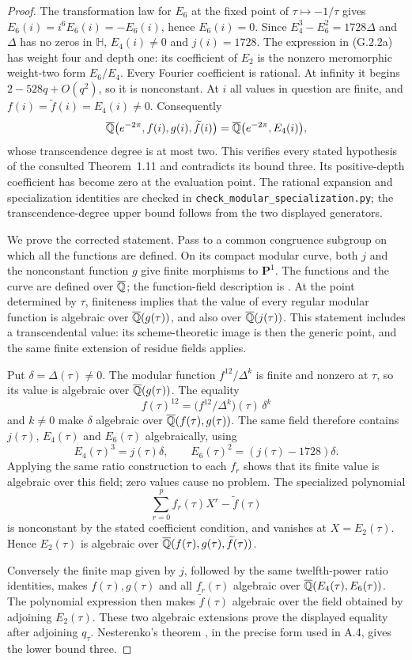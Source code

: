 \begin{proof}
The transformation law for $E_6$ at the fixed point of
$\tau\mapsto-1/\tau$ gives
$E_6(i)=i^6E_6(i)=-E_6(i)$, hence $E_6(i)=0$.
Since $E_4^3-E_6^2=1728\Delta$ and $\Delta$ has no zeros
in $\mathbb H$, $E_4(i)\ne0$ and $j(i)=1728$.
The expression in (G.2.2a) has weight four and depth one:
its coefficient of $E_2$ is the nonzero meromorphic
weight-two form $E_6/E_4$. Every Fourier coefficient is
rational. At infinity it begins $2-528q+O(q^2)$, so it
is nonconstant. At $i$ all values in question are finite,
and $f(i)=\widetilde f(i)=E_4(i)\ne0$. Consequently
\[
 \overline{\mathbb Q}\bigl(e^{-2\pi},f(i),g(i),\widetilde f(i)\bigr)
       =\overline{\mathbb Q}\bigl(e^{-2\pi},E_4(i)\bigr),
\]
whose transcendence degree is at most two. This verifies
every stated hypothesis of the consulted Theorem~1.11 and
contradicts its bound three. Its positive-depth coefficient
has become zero at the evaluation point. The rational
expansion and specialization identities are checked in
\texttt{check\_modular\_specialization.py}; the transcendence-degree
upper bound follows from the two displayed generators.

We prove the corrected statement. Pass to a common congruence
subgroup on which all the functions are defined. On its
compact modular curve, both $j$ and the nonconstant function
$g$ give finite morphisms to $\mathbf P^1$. The functions
and the curve are defined over $\overline{\mathbb Q}$; the function-field
description is \cite[Theorem 2.11, pp.10--11]{BhowmikPathak2024}.
At the point determined by $\tau$, finiteness implies that
the value of every regular modular function is algebraic
over $\overline{\mathbb Q}(g(\tau))$, and also over $\overline{\mathbb Q}(j(\tau))$.
This statement includes a transcendental value: its
scheme-theoretic image is then the generic point, and the
same finite extension of residue fields applies.

Put $\delta=\Delta(\tau)\ne0$. The modular function
$f^{12}/\Delta^k$ is finite and nonzero at $\tau$, so its
value is algebraic over $\overline{\mathbb Q}(g(\tau))$. The equality
\[
 f(\tau)^{12}
   =\bigl(f^{12}/\Delta^k\bigr)(\tau)\,\delta^k
\]
and $k\ne0$ make $\delta$ algebraic over
$\overline{\mathbb Q}(f(\tau),g(\tau))$. The same field therefore contains
$j(\tau)$, $E_4(\tau)$ and $E_6(\tau)$ algebraically, using
\[
 E_4(\tau)^3=j(\tau)\delta,\qquad
 E_6(\tau)^2=(j(\tau)-1728)\delta.
\]
Applying the same ratio construction to each $f_r$ shows
that its finite value is algebraic over this field; zero
values cause no problem. The specialized polynomial
\[
 \sum_{r=0}^p f_r(\tau)X^r-\widetilde f(\tau)
\]
is nonconstant by the stated coefficient condition, and
vanishes at $X=E_2(\tau)$. Hence $E_2(\tau)$ is algebraic
over $\overline{\mathbb Q}(f(\tau),g(\tau),\widetilde f(\tau))$.

Conversely the finite map given by $j$, followed by the same
twelfth-power ratio identities, makes $f(\tau),g(\tau)$
and all $f_r(\tau)$ algebraic over
$\overline{\mathbb Q}(E_4(\tau),E_6(\tau))$. The polynomial expression then
makes $\widetilde f(\tau)$ algebraic over the field obtained
by adjoining $E_2(\tau)$. These two algebraic extensions
prove the displayed equality after adjoining $q_\tau$.
Nesterenko's theorem \cite[Theorem 1]{EllNesterenko1996},
in the precise form used in A.4,
gives the lower bound three.
\end{proof}


